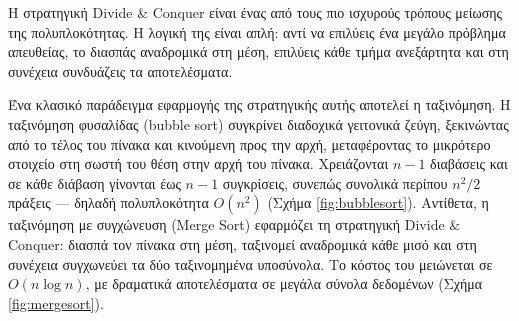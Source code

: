 \documentclass[a4paper, 11pt]{article}
\begin{document}
Η στρατηγική Divide \& Conquer είναι ένας από τους πιο ισχυρούς τρόπους
μείωσης της πολυπλοκότητας. Η λογική της είναι απλή: αντί να επιλύεις
ένα μεγάλο πρόβλημα απευθείας, το διασπάς αναδρομικά στη μέση, επιλύεις
κάθε τμήμα ανεξάρτητα και στη συνέχεια συνδυάζεις τα αποτελέσματα.

Ένα κλασικό παράδειγμα εφαρμογής της στρατηγικής αυτής αποτελεί η
ταξινόμηση. Η ταξινόμηση φυσαλίδας (bubble sort) συγκρίνει διαδοχικά
γειτονικά ζεύγη, ξεκινώντας από το τέλος του πίνακα και κινούμενη προς
την αρχή, μεταφέροντας το μικρότερο στοιχείο στη σωστή του θέση στην
αρχή του πίνακα. Χρειάζονται \(n-1\) διαβάσεις και σε κάθε διάβαση
γίνονται έως \(n-1\) συγκρίσεις, συνεπώς συνολικά περίπου \(n^2/2\)
πράξεις --- δηλαδή πολυπλοκότητα \(O(n^2)\) (Σχήμα
\ref{fig:bubblesort}). Αντίθετα, η ταξινόμηση με συγχώνευση (Merge Sort)
εφαρμόζει τη στρατηγική Divide \& Conquer: διασπά τον πίνακα στη μέση,
ταξινομεί αναδρομικά κάθε μισό και στη συνέχεια συγχωνεύει τα δύο
ταξινομημένα υποσύνολα. Το κόστος του μειώνεται σε \(O(n \log n)\), με
δραματικά αποτελέσματα σε μεγάλα σύνολα δεδομένων (Σχήμα
\ref{fig:mergesort}).
\end{document}
